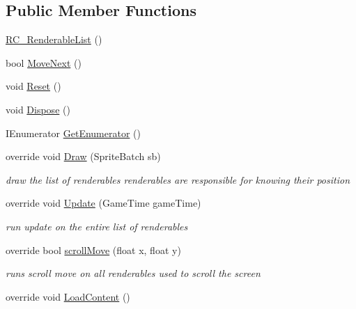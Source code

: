 \subsection*{Public Member Functions}
\begin{DoxyCompactItemize}
\item 
\mbox{\hyperlink{class_r_c___framework_1_1_r_c___renderable_list_a9fa56c1b694187351daa9b464722ec1b}{R\+C\+\_\+\+Renderable\+List}} ()
\item 
bool \mbox{\hyperlink{class_r_c___framework_1_1_r_c___renderable_list_a2974cbded928cdb237fadf5c8adbdd2c}{Move\+Next}} ()
\item 
void \mbox{\hyperlink{class_r_c___framework_1_1_r_c___renderable_list_ac70aff9f6f35ecb69378a70ad8e41f0e}{Reset}} ()
\item 
void \mbox{\hyperlink{class_r_c___framework_1_1_r_c___renderable_list_aaae1bbc19f649e2930c8c829625c9a5e}{Dispose}} ()
\item 
I\+Enumerator \mbox{\hyperlink{class_r_c___framework_1_1_r_c___renderable_list_a0c8e476d6928961b5e6e4e4a3d37bba9}{Get\+Enumerator}} ()
\item 
override void \mbox{\hyperlink{class_r_c___framework_1_1_r_c___renderable_list_a274ae54ac48b42415db6b3193587e8d4}{Draw}} (Sprite\+Batch sb)
\begin{DoxyCompactList}\small\item\em draw the list of renderables renderables are responsible for knowing their position \end{DoxyCompactList}\item 
override void \mbox{\hyperlink{class_r_c___framework_1_1_r_c___renderable_list_a2de302d2ee2f4df7c90fb7df36c4f3fe}{Update}} (Game\+Time game\+Time)
\begin{DoxyCompactList}\small\item\em run update on the entire list of renderables \end{DoxyCompactList}\item 
override bool \mbox{\hyperlink{class_r_c___framework_1_1_r_c___renderable_list_ad7238f93a7ad63020771702a2db0ccfe}{scroll\+Move}} (float x, float y)
\begin{DoxyCompactList}\small\item\em runs scroll move on all renderables used to scroll the screen \end{DoxyCompactList}\item 
override void \mbox{\hyperlink{class_r_c___framework_1_1_r_c___renderable_list_a953e8eb6f4422a7f0bebb17ee0455c42}{Load\+Content}} ()

\end{DoxyCompactItemize}
